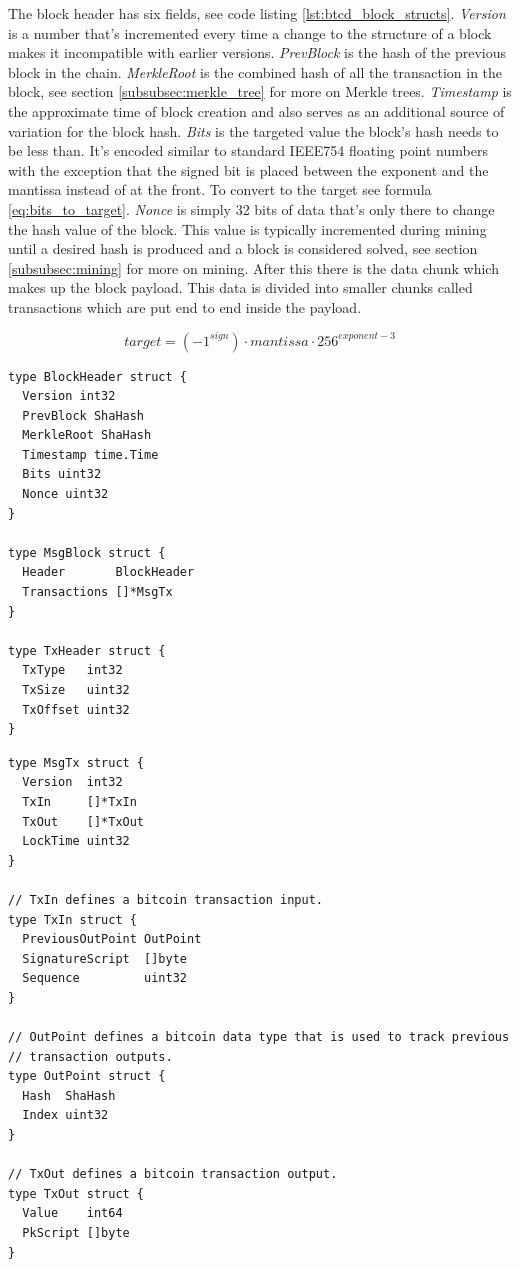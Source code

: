 \documentclass[12pt]{article}
\begin{document}
The block header has six fields, see code listing \ref{lst:btcd_block_structs}. \emph{Version} is a number that's incremented every time a change to the structure of a block makes it incompatible with earlier versions. \emph{PrevBlock} is the hash of the previous block in the chain. \emph{MerkleRoot} is the combined hash of all the transaction in the block, see section \ref{subsubsec:merkle_tree} for more on Merkle trees. \emph{Timestamp} is the approximate time of block creation and also serves as an additional source of variation for the block hash. \emph{Bits} is the targeted value the block's hash needs to be less than. It's encoded similar to standard IEEE754 floating point numbers with the exception that the signed bit is placed between the exponent and the mantissa instead of at the front. To convert to the target see formula \ref{eq:bits_to_target}. \emph{Nonce} is simply 32 bits of data that's only there to change the hash value of the block. This value is typically incremented during mining until a desired hash is produced and a block is considered solved, see section \ref{subsubsec:mining} for more on mining. After this there is the data chunk which makes up the block payload. This data is divided into smaller chunks called transactions which are put end to end inside the payload. 

\begin{equation}\label{eq:bits_to_target}
\mathit{target} = (-1^{\mathit{sign}}) \cdot \mathit{mantissa} \cdot 256^{\mathit{exponent-3}}
\end{equation}

\begin{lstlisting}[float=!ht,caption={Btcd Block Structure},label=lst:btcd_block_structs]
type BlockHeader struct {
  Version int32
  PrevBlock ShaHash
  MerkleRoot ShaHash
  Timestamp time.Time
  Bits uint32
  Nonce uint32
}

type MsgBlock struct {
  Header       BlockHeader
  Transactions []*MsgTx
}

type TxHeader struct {
  TxType   int32
  TxSize   uint32
  TxOffset uint32
}
\end{lstlisting}

\begin{lstlisting}[float=!h,caption={Original Btcd Transaction Structure},label=lst:bctd_transaction_structs]
type MsgTx struct {
  Version  int32
  TxIn     []*TxIn
  TxOut    []*TxOut
  LockTime uint32
}

// TxIn defines a bitcoin transaction input.
type TxIn struct {
  PreviousOutPoint OutPoint
  SignatureScript  []byte
  Sequence         uint32
}

// OutPoint defines a bitcoin data type that is used to track previous
// transaction outputs.
type OutPoint struct {
  Hash  ShaHash
  Index uint32
}

// TxOut defines a bitcoin transaction output.
type TxOut struct {
  Value    int64
  PkScript []byte
}
\end{lstlisting}
\end{document}
